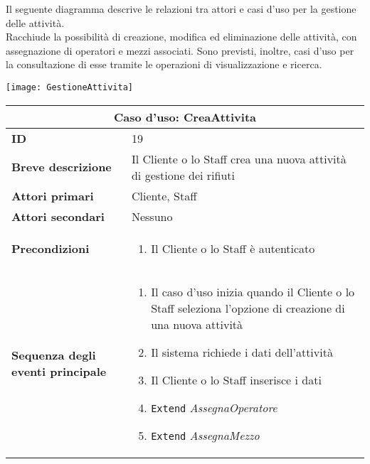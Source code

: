 \documentclass[a4paper]{report}
\begin{document}
\clearpage
{}

Il seguente diagramma descrive le relazioni tra attori e casi d’uso per la gestione delle attività.\\
Racchiude la possibilità di creazione, modifica ed eliminazione delle attività, con assegnazione di operatori e mezzi associati. Sono previsti, inoltre, casi d’uso per la consultazione di esse tramite le operazioni di visualizzazione e ricerca.


\begin{figure*}[ht]
    \centering
    \texttt{[image: GestioneAttivita]}
\end{figure*}

\clearpage
\begin{table}[H]
\vspace*{-0cm}
\renewcommand{\arraystretch}{1.9}
\begin{tabular}{|p{3.9cm}|p{9.9cm}|}
\hline
\multicolumn{2}{|c|}{\textbf{Caso d’uso: CreaAttivita}} \\ \hline
	\textbf{ID} & 19 \\ \hline
	\textbf{Breve descrizione} & Il Cliente o lo Staff crea una nuova attività di gestione dei rifiuti \\ \hline
	\textbf{Attori primari} & Cliente, Staff \\ \hline
	\textbf{Attori secondari} & Nessuno \\ \hline
	\textbf{Precondizioni} & \begin{enumerate}[leftmargin=14pt,label=\arabic*.,labelsep=0.5em,topsep=0pt,partopsep=0pt,parsep=0pt,itemsep=0pt]
    \item Il Cliente o lo Staff è autenticato
\end{enumerate} \\ \hline
	\textbf{Sequenza degli eventi principale} & \begin{enumerate}[leftmargin=14pt,label=\arabic*.,labelsep=0.5em,topsep=0pt,partopsep=0pt,parsep=0pt,itemsep=0pt]
    \item Il caso d’uso inizia quando il Cliente o lo Staff seleziona l'opzione di creazione di una nuova attività
    \item Il sistema richiede i dati dell’attività
    \item Il Cliente o lo Staff inserisce i dati
    \item \texttt{Extend} \textit{AssegnaOperatore}
    \item \texttt{Extend} \textit{AssegnaMezzo}

\end{enumerate}
\end{tabular}
\end{table}
\end{document}
